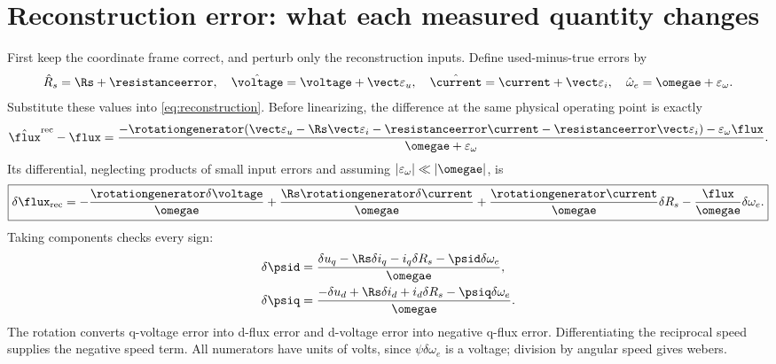 \section{Reconstruction error: what each measured quantity changes}
\label{sec:measurement}
First keep the coordinate frame correct, and perturb only the reconstruction
inputs. Define used-minus-true errors by
\begin{equation}
 \hat R_s=\Rs+\resistanceerror,\quad \hat\voltage=\voltage+\vect\varepsilon_u,
 \quad\hat\current=\current+\vect\varepsilon_i,\quad
 \hat\omega_e=\omegae+\varepsilon_\omega.
 \label{eq:error-definitions}
\end{equation}
Substitute these values into \cref{eq:reconstruction}. Before linearizing,
the difference at the same physical operating point is exactly
\begin{equation}
 \hat\flux^{\rm rec}-\flux=
 \frac{-\rotationgenerator(\vect\varepsilon_u-\Rs\vect\varepsilon_i
       -\resistanceerror\current-\resistanceerror\vect\varepsilon_i)
       -\varepsilon_\omega\flux}{\omegae+\varepsilon_\omega}.
 \label{eq:exact-input-error}
\end{equation}
Its differential, neglecting products of small input errors and assuming
$|\varepsilon_\omega|\ll|\omegae|$, is
\begin{equation}
 \boxed{\delta\flux_{\rm rec}=
 -\frac{\rotationgenerator\delta\voltage}{\omegae}
 +\frac{\Rs\rotationgenerator\delta\current}{\omegae}
 +\frac{\rotationgenerator\current}{\omegae}\delta R_s
 -\frac{\flux}{\omegae}\delta\omega_e.}\label{eq:input-sensitivity}
\end{equation}
Taking components checks every sign:
\begin{align}
 \delta\psid&=\frac{\delta u_q-\Rs\delta i_q-i_q\delta R_s
                  -\psid\delta\omega_e}{\omegae},\\
 \delta\psiq&=\frac{-\delta u_d+\Rs\delta i_d+i_d\delta R_s
                  -\psiq\delta\omega_e}{\omegae}.
\end{align}
The rotation converts q-voltage error into d-flux error and d-voltage error
into negative q-flux error. Differentiating the reciprocal speed supplies the
negative speed term. All numerators have units of volts, since
$\psi\delta\omega_e$ is a voltage; division by angular speed gives webers.

